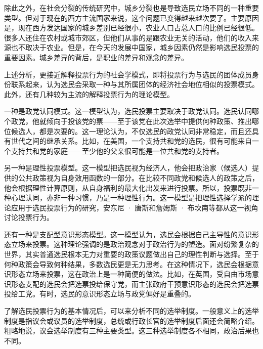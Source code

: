 除此之外，在社会分裂的传统研究中，城乡分裂也是导致选民立场不同的一种重要类型。但对于现在的西方主流国家来说，这个问题已变得越来越次要了。主要原因是，现在西方发达国家的城乡差别已经很小，农业人口占总人口的比例已经很低。很多人还住在农村或城市郊区，但他们从事的是跟农业无关的活动，他们的收入来源也不取决于农业。但是，在今天的发展中国家，城乡因素仍然是影响选民投票的重要因素。城乡差异的背后，是职业的差异和观念的差异。

上述分析，更接近解释投票行为的社会学模式，即将投票行为与选民的团体成员身份联系起来，认为选民会采取一种与其所属团体的经济社会地位相似的投票模式。此外，还有几种较为主流的解释投票行为的理论模型。

一种是政党认同模式。这一模型认为，选民投票主要取决于政党认同。选民认同哪个政党，他就倾向于投该党的票——至于该党在此次选举中提供何种政策、推出哪位候选人，都是次要的。这一理论认为，不仅选民的政党认同非常稳定，而且还具有世代之间的继承关系。比如，在美国，一个支持共和党的选民，很有可能来自一个支持共和党的家庭——至少他的父亲很可能是一位共和党的支持者。

另一种是理性投票模型。这一模型把选民视为经济人，他会把政治家（候选人）提供的公共政策视为自身效用函数的一部分。在比较不同政党和候选人的政策之后，他会根据理性计算原则，从自身福利的最大化出发来进行投票。所以，投票既非一种心理认同，亦非一种习惯，乃是一种理性行为。这一模型是把理性选择学派的理论应用于选民投票行为的研究，安东尼 · 唐斯和詹姆斯 · 布坎南等都从这一视角讨论投票行为。

还有一种是支配型意识形态模型。这一模型认为，选民会根据自己主导性的意识形态立场来投票。这种理论强调的是政治观念对于政治行为的塑造。面对纷繁复杂的世界，其实普通选民根本无力对重要的政策议题做出自己的理性判断与选择。至于何种政策会导致何种结果，多数选民更是无力思考。在这种情况下，选民会根据意识形态立场来投票，这在政治上是一种简便的做法。比如，在英国，受自由市场意识形态支配的选民会把选票投给保守党，而主张政府干预意识形态的选民会把选票投给工党。有时，选民的意识形态立场与政党偏好是重叠的。


了解选民投票行为的基本情况后，可以来分析不同的选举制度。一般意义上的选举制度是指议会或议员的选举制度，总统或行政长官的选举制度后面还会简略介绍。粗略地说，议会选举制度有三种主要类型。这三种选举制度各不相同，政治后果也不同。


